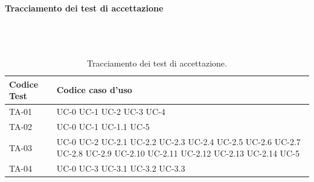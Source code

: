 \documentclass[8pt]{article}
\newcommand{\subsubsubsection}[1]{\paragraph{#1}\mbox{}\\\\}
\begin{document}
\subsubsubsection{Tracciamento dei test di accettazione}
\renewcommand{\arraystretch}{2.5}
\begin{longtable}{|>{\centering}p{4cm}|>{\centering\arraybackslash}p{4cm}|}
\hline
\rowcolor{white}
\textbf{Codice Test} & \textbf{Codice caso d'uso} \\
\hline
\endfirsthead
\rowcolor{white}
\caption{Tracciamento dei test di accettazione.}
\label{table:Tracciamento dei test di accettazione}
\endlastfoot
    TA-01 & UC-0 \newline
            UC-1 \newline
            UC-2 \newline
            UC-3 \newline
            UC-4 
    \\
    \hline
    TA-02 & UC-0 \newline
            UC-1 \newline
            UC-1.1 \newline
            UC-5
    \\
    \hline 
    TA-03 & UC-0 \newline
            UC-2 \newline
            UC-2.1 \newline
            UC-2.2 \newline
            UC-2.3 \newline
            UC-2.4 \newline
            UC-2.5 \newline
            UC-2.6 \newline
            UC-2.7 \newline
            UC-2.8 \newline
            UC-2.9 \newline
            UC-2.10 \newline
            UC-2.11 \newline
            UC-2.12 \newline
            UC-2.13 \newline
            UC-2.14 \newline
            UC-5
    \\
    \hline
    TA-04 & UC-0 \newline
            UC-3 \newline 
            UC-3.1 \newline
            UC-3.2 \newline
            UC-3.3 \newline

\end{longtable}
\end{document}
